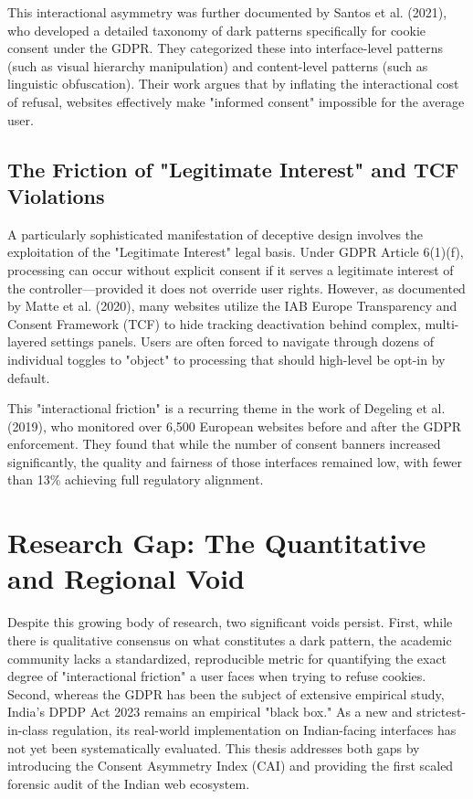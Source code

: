 \documentclass[12pt,a4paper]{report}
\begin{document}
This interactional asymmetry was further documented by Santos et al. (2021), who developed a detailed taxonomy of dark patterns specifically for cookie consent under the GDPR. They categorized these into interface-level patterns (such as visual hierarchy manipulation) and content-level patterns (such as linguistic obfuscation). Their work argues that by inflating the interactional cost of refusal, websites effectively make "informed consent" impossible for the average user.

\subsection{The Friction of "Legitimate Interest" and TCF Violations}

A particularly sophisticated manifestation of deceptive design involves the exploitation of the "Legitimate Interest" legal basis. Under GDPR Article 6(1)(f), processing can occur without explicit consent if it serves a legitimate interest of the controller—provided it does not override user rights. However, as documented by Matte et al. (2020), many websites utilize the IAB Europe Transparency and Consent Framework (TCF) to hide tracking deactivation behind complex, multi-layered settings panels. Users are often forced to navigate through dozens of individual toggles to "object" to processing that should high-level be opt-in by default.

This "interactional friction" is a recurring theme in the work of Degeling et al. (2019), who monitored over 6,500 European websites before and after the GDPR enforcement. They found that while the number of consent banners increased significantly, the quality and fairness of those interfaces remained low, with fewer than 13\% achieving full regulatory alignment.

\section{Research Gap: The Quantitative and Regional Void}

Despite this growing body of research, two significant voids persist. First, while there is qualitative consensus on what constitutes a dark pattern, the academic community lacks a standardized, reproducible metric for quantifying the exact degree of "interactional friction" a user faces when trying to refuse cookies. Second, whereas the GDPR has been the subject of extensive empirical study, India’s DPDP Act 2023 remains an empirical "black box." As a new and strictest-in-class regulation, its real-world implementation on Indian-facing interfaces has not yet been systematically evaluated. This thesis addresses both gaps by introducing the Consent Asymmetry Index (CAI) and providing the first scaled forensic audit of the Indian web ecosystem.
\end{document}
